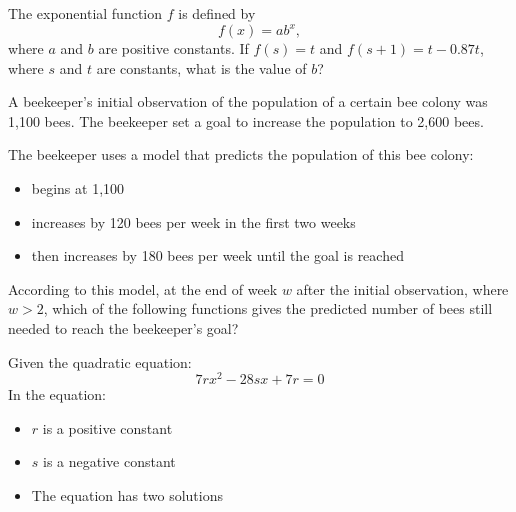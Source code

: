 \vspace{2em}
\newpage

\noindent\markforreview
\vspace{1em}

The exponential function \(f\) is defined by
\[
f(x) = ab^x,
\]
where \(a\) and \(b\) are positive constants.
If \(f(s) = t\) and \(f(s + 1) = t - 0.87t\), where \(s\) and \(t\) are constants, what is the value of \(b\)?

\vspace{0.75em}


\vspace{2em}
\newpage

\noindent\markforreview
\vspace{1em}

A beekeeper's initial observation of the population of a certain bee colony was 1,100 bees.
The beekeeper set a goal to increase the population to 2,600 bees.

The beekeeper uses a model that predicts the population of this bee colony:

\begin{itemize}
\item begins at 1,100
\item increases by 120 bees per week in the first two weeks
\item then increases by 180 bees per week until the goal is reached
\end{itemize}

According to this model, at the end of week \(w\) after the initial observation, where \(w > 2\),
which of the following functions gives the predicted number of bees still needed to reach the beekeeper's goal?

\vspace{0.75em}


\vspace{2em}
\newpage

\noindent\markforreview
\vspace{1em}

Given the quadratic equation:
\[
7rx^2 - 28sx + 7r = 0
\]
In the equation:

\begin{itemize}
\item \(r\) is a positive constant
\item \(s\) is a negative constant
\item The equation has two solutions
\end{itemize}

